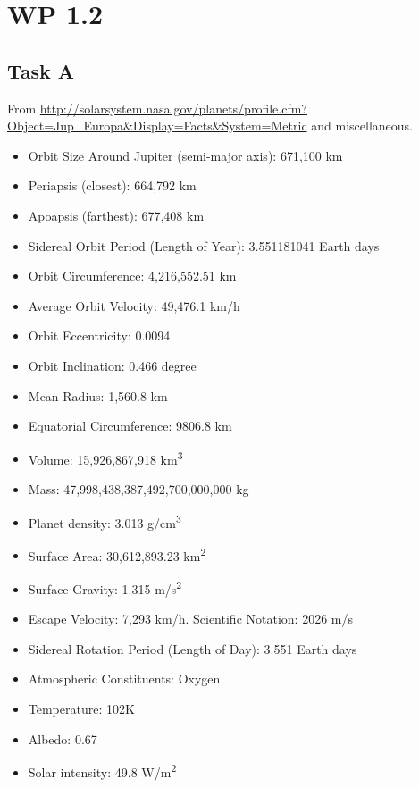 \documentclass{article}
\begin{document}
\section*{WP 1.2}
\subsection*{Task A}
From \url{http://solarsystem.nasa.gov/planets/profile.cfm?Object=Jup_Europa&Display=Facts&System=Metric} and miscellaneous.
\begin{itemize}
\item{Orbit Size Around Jupiter (semi-major axis):}  671,100 km
\item{Periapsis (closest):}  664,792 km
\item{Apoapsis (farthest):}  677,408 km
\item{Sidereal Orbit Period (Length of Year):} 3.551181041 Earth days
\item{Orbit Circumference:}  4,216,552.51 km
\item{Average Orbit Velocity:}  49,476.1 km/h
\item{Orbit Eccentricity:} 0.0094
\item{Orbit Inclination:} 0.466 degree
\item{Mean Radius:}  1,560.8 km
\item{Equatorial Circumference:}  9806.8 km
\item{Volume:}  15,926,867,918 \si{km^3}
\item{Mass:}  47,998,438,387,492,700,000,000 kg
\item{Planet density:}  3.013 \si{g/cm^3}
\item{Surface Area:}  30,612,893.23 \si{km^2}
\item{Surface Gravity:}  1.315 \si{m/s^2}
\item{Escape Velocity:}  7,293 km/h. Scientific Notation: 2026 m/s
\item{Sidereal Rotation Period (Length of Day):} 3.551 Earth days
\item{Atmospheric Constituents:} Oxygen
\item{Temperature:} 102K
\item{Albedo:} 0.67
\item{Solar intensity:} 49.8 \si{W/m^2}
\end{itemize}
\end{document}
